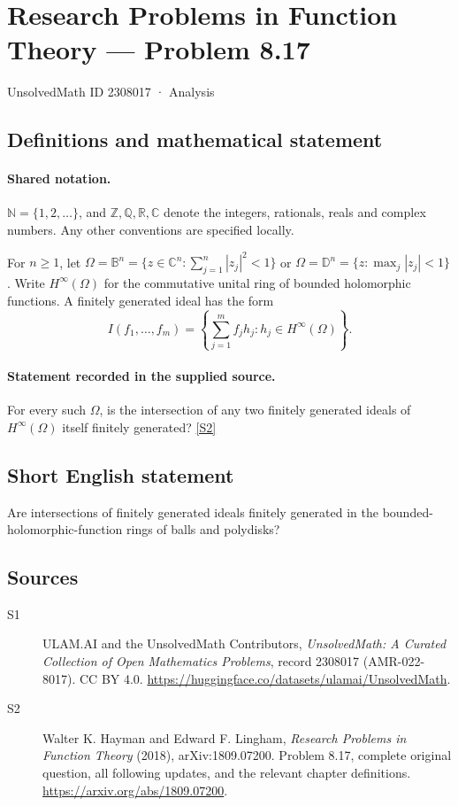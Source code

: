 \documentclass[11pt]{book}
\newcommand{\sref}[2]{\hyperlink{source:#1:#2}{[S#2]}}
\begin{document}
\setcounter{section}{2308016}
\section{Research Problems in Function Theory — Problem 8.17}\label{2308017}
{\small\sffamily UnsolvedMath ID 2308017 · Analysis}
\subsection{Definitions and mathematical statement}

\paragraph{Shared notation.}$\mathbb N=\{1,2,\ldots\}$, and $\mathbb Z,\mathbb Q,\mathbb R,\mathbb C$ denote the integers, rationals, reals and complex numbers. Any other conventions are specified locally.


For $n\ge1$, let $\Omega=\mathbb B^n=\{z\in\mathbb C^n:\sum_{j=1}^n|z_j|^2<1\}$ or $\Omega=\mathbb D^n=\{z:\max_j|z_j|<1\}$. Write $H^{\infty}(\Omega)$ for the commutative unital ring of bounded holomorphic functions. A finitely generated ideal has the form \[I(f_1,\ldots,f_m)=\left\{\sum_{j=1}^mf_jh_j:h_j\in H^{\infty}(\Omega)\right\}.\]
\paragraph{Statement recorded in the supplied source.}
For every such $\Omega$, is the intersection of any two finitely generated ideals of $H^{\infty}(\Omega)$ itself finitely generated? \sref{2308017}{2}
\subsection{Short English statement}
Are intersections of finitely generated ideals finitely generated in the bounded-holomorphic-function rings of balls and polydisks?
\subsection{Sources}
\begin{description}
\item[\hypertarget{source:2308017:1}{S1}] ULAM.AI and the UnsolvedMath Contributors, \emph{UnsolvedMath: A Curated Collection of Open Mathematics Problems}, record 2308017 (AMR-022-8017). CC BY 4.0. \url{https://huggingface.co/datasets/ulamai/UnsolvedMath}.
\item[\hypertarget{source:2308017:2}{S2}] Walter K. Hayman and Edward F. Lingham, \emph{Research Problems in Function Theory} (2018), arXiv:1809.07200. Problem 8.17, complete original question, all following updates, and the relevant chapter definitions. \url{https://arxiv.org/abs/1809.07200}.
\end{description}
\label{end:2308017}
\end{document}
